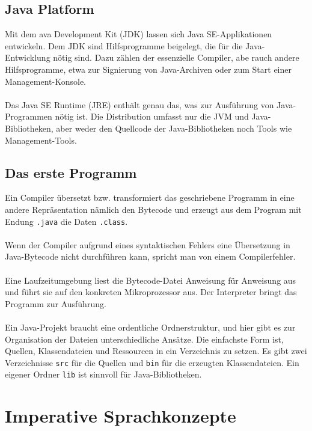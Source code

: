 \subsection{Java Platform}
Mit dem ava Development Kit (JDK) lassen sich Java SE-Applikationen entwickeln. Dem JDK sind Hilfsprogramme beigelegt, die für die Java-Entwicklung nötig sind. Dazu zählen der essenzielle Compiler, abe rauch andere Hilfsprogramme, etwa zur Signierung von Java-Archiven oder zum Start einer Management-Konsole.
\\\\
Das Java SE Runtime (JRE) enthält genau das, was zur Ausführung von Java-Programmen nötig ist. Die Distribution umfasst nur die JVM und Java-Bibliotheken, aber weder den Quellcode der Java-Bibliotheken noch Tools wie Management-Tools.
\subsection{Das erste Programm}
Ein Compiler übersetzt bzw. transformiert das geschriebene Programm in eine andere Repräsentation nämlich den Bytecode und erzeugt aus dem Program mit Endung \texttt{.java} die Daten \texttt{.class}.
\\\\
Wenn der Compiler aufgrund eines syntaktischen Fehlers eine Übersetzung in Java-Bytecode nicht durchführen kann, spricht man von einem Compilerfehler. 
\\\\
Eine Laufzeitumgebung liest die Bytecode-Datei Anweisung für Anweisung aus und führt sie auf den konkreten Mikroprozessor aus. Der Interpreter bringt das Programm zur Ausführung.
\\\\
Ein Java-Projekt braucht eine ordentliche Ordnerstruktur, und hier gibt es zur Organisation der Dateien unterschiedliche Ansätze. Die einfachste Form ist, Quellen, Klassendateien und Ressourcen in ein Verzeichnis zu setzen. Es gibt zwei Verzeichnisse \texttt{src} für die Quellen und \texttt{bin} für die erzeugten Klassendateien. Ein eigener Ordner \texttt{lib} ist sinnvoll für Java-Bibliotheken.  
\section{Imperative Sprachkonzepte}
